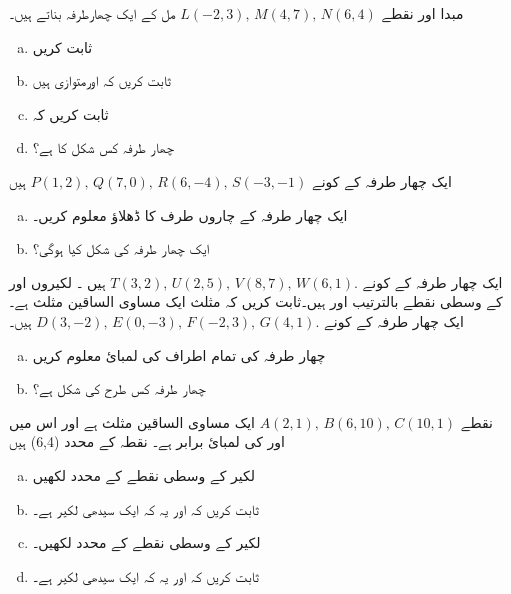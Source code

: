 مبدا    اور نقطے  \( L(-2,3), \, M(4,7), \, N(6,4) \) مل کے ایک چھارطرفہ بناتے ہیں۔
\begin{multicols}{2}
\begin{enumerate}[a.]
\item
ثابت کریں 
\item
ثابت کریں کہ     اورمتوازی ہیں 
\item
ثابت کریں کہ
\item
چھار طرفہ     کس شکل کا ہے؟
\end{enumerate}
\end{multicols}
ایک چھار طرفہ کے کونے \( P(1,2), \, Q(7,0), \, R(6,-4), \, S(-3,-1) \) ہیں 
\begin{multicols}{2}
\begin{enumerate}[a.]
\item
ایک چھار طرفہ کے چاروں طرف کا ڈھلاؤ معلوم کریں۔
\item
ایک چھار طرفہ   کی شکل کیا ہوگی؟
\end{enumerate}
\end{multicols}
ایک چھار طرفہ کے کونے \( T(3,2), \, U(2,5), \, V(8,7), \, W(6,1). \) ہیں ۔ لکیروں    اور        کے وسطی نقطے بالترتیب      اور      ہیں۔ثابت کریں کہ مثلث        ایک مساوی الساقین مثلث ہے۔      
%
ایک چھار طرفہ کے کونے \( D(3,-2), \, E(0,-3), \, F(-2,3), \, G(4,1). \) ہیں۔
\begin{multicols}{2}
\begin{enumerate}[a.]
\item
چھار طرفہ کی تمام اطراف کی لمبائ معلوم کریں
\item
چھار طرفہ کس طرح کی شکل ہے؟
\end{enumerate}
\end{multicols}
نقطے  \( A(2,1), \, B(6,10), \, C(10,1) \) ایک مساوی الساقین مثلث ہے اور اس میں     اور       کی لمبائ برابر ہے۔ نقطہ  کے  محدد  (6,4)   ہیں
\begin{multicols}{2}
\begin{enumerate}[a.]
\item
لکیر  کے  وسطی نقطے    کے محدد لکھیں
\item
ثابت کریں کہ       اور یہ کہ        ایک سیدھی لکیر ہے۔
\item
لکیر     کے وسطی نقطے     کے محدد لکھیں۔
\item
ثابت کریں کہ  اور یہ کہ  ایک سیدھی لکیر ہے۔
\end{enumerate}
\end{multicols}
